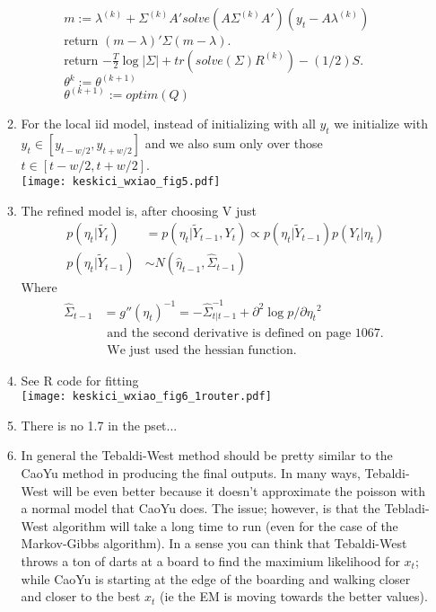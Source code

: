 \documentclass[paper=a4, fontsize=11pt]{scrartcl}
\begin{document}
\begin{enumerate}
\begin{enumerate}[1]
\begin{enumerate}[a.]
\begin{enumerate}[I.]
\begin{tabbing}
                  \hspace{3cm} $m := \lambda^{(k)} + \Sigma^{(k)}A'solve(A\Sigma^{(k)}A')(y_t - A\lambda^{(k)})$ \\
                  \hspace{3cm} return $(m - \lambda)'\Sigma(m - \lambda)$. \\
                  \hspace{2cm} return $-\frac{T}{2}\log{|\Sigma|} + tr(solve(\Sigma)R^{(k)}) - (1/2)S$. \\
                  \hspace{1cm} $\theta^{k} := \theta^{(k+1)}$ \\
                  \hspace{1cm} $\theta^{(k+1)} := optim(Q)$
                \end{tabbing}
            \end{enumerate}
        \end{enumerate}
      \item For the local iid model, instead of initializing with all $y_t$ we initialize with $y_t \in [y_{t - w/2}, y_{t+w/2}]$ and we also sum only over those $t \in [t - w/2, t + w/2]$. \\ \texttt{[image: keskici\_wxiao\_fig5.pdf]}
      \item The refined model is, after choosing V just \\
      \begin{align*}
        p(\eta_t|\widetilde{Y_t}) &= p(\eta_t|\widetilde{Y}_{t-1}, Y_t) \propto p(\eta_t|\widetilde{Y}_{t-1})p(Y_t|\eta_t) \\
        p(\eta_t|\widetilde{Y}_{t-1}) &\sim N(\hat{\eta}_{t-1}, \hat{\Sigma}_{t-1})
      \end{align*}
      Where
      \begin{align*}
        \hat{\Sigma}_{t-1} &= g''(\eta_t)^{-1} = -\hat{\Sigma}^{-1}_{t|t-1} + \partial^2{\log{p}}/\partial{\eta_t}^2 \\
        & \text{ and the second derivative is defined on page 1067. } \\
        & \text { We just used the hessian function. }
      \end{align*}
      \item See R code for fitting\\
      \texttt{[image: keskici\_wxiao\_fig6\_1router.pdf]}
      \item There is no 1.7 in the pset...
      \item In general the Tebaldi-West method should be pretty similar to the CaoYu method in producing the final outputs. In many ways, Tebaldi-West will be even better because it doesn't approximate the poisson with a normal model that CaoYu does. The issue; however, is that the Tebladi-West algorithm will take a long time to run (even for the case of the Markov-Gibbs algorithm). In a sense you can think that Tebaldi-West throws a ton of darts at a board to find the maximium likelihood for $x_t$; while CaoYu is starting at the edge of the boarding and walking closer and closer to the best $x_t$ (ie the EM is moving towards the better values).

\end{enumerate}
\end{enumerate}
\end{document}
